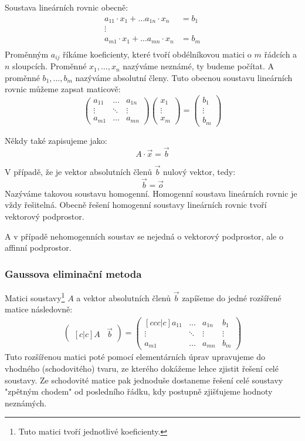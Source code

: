 Soustava lineárních rovnic obecně:
\begin{align*}
    a_{11} \cdot x_1 + \ldots a_{1n} \cdot x_n &= b_1\\
    \vdots\\
    a_{m1} \cdot x_1 + \ldots a_{mn} \cdot x_n &= b_m\\
\end{align*}
Proměnným $a_{ij}$ říkáme koeficienty, které tvoří obdélníkovou matici
o $m$ řádcích a $n$ sloupcích. Proměnné $x_1, \ldots, x_n$ nazýváme neznámé, ty budeme
počítat. A proměnné $b_1, \ldots, b_m$ nazýváme absolutní členy.
Tuto obecnou soustavu lineárních rovnic můžeme zapsat maticově:
\[
    \begin{pmatrix}
        a_{11} & \ldots & a_{1n} \\
        \vdots & \ddots & \vdots\\
        a_{m1} & \ldots & a_{mn}
    \end{pmatrix}
    \begin{pmatrix}
        x_1 \\
        \vdots \\
        x_m
    \end{pmatrix}
    =
    \begin{pmatrix}
        b_1 \\
        \vdots \\
        b_m
    \end{pmatrix}
\]

Někdy také zapisujeme jako:
$$A \cdot \vec{x} = \vec{b}$$

V případě, že je vektor absolutních členů $\vec{b}$ nulový vektor, tedy:
$$\vec{b} = \vec{o}$$
Nazýváme takovou soustavu homogenní. Homogenní soustava lineárních rovnic je vždy řešitelná.
Obecně řešení homogenní soustavy lineárních rovnic tvoří vektorový podprostor.

A v případě nehomogenních soustav se nejedná o vektorový podprostor, ale o affinní podprostor.

\subsubsection{Gaussova eliminační metoda}
Matici soustavy\footnote{Tuto matici tvoří jednotlivé koeficienty.} $A$ a vektor absolutních členů
$\vec{b}$ zapíšeme do jedné rozšířené matice následovně:
\begin{align*}
    \begin{pmatrix}[c|c]
        A & \vec{b}
    \end{pmatrix} =
    \begin{pmatrix}[ccc|c]
        a_{11} & \ldots & a_{1n} & b_1\\
        \vdots & \ddots & \vdots & \vdots \\
        a_{m1} & \ldots & a_{mn} & b_m
    \end{pmatrix}
\end{align*}
Tuto rozšířenou matici poté pomocí elementárních úprav upravujeme do vhodného (schodovitého) tvaru,
ze kterého dokážeme lehce zjistit řešení celé soustavy. Ze schodovité matice pak jednoduše dostaneme
řešení celé soustavy "zpětným chodem" od posledního řádku, kdy postupně zjišťujeme hodnoty neznámých.

